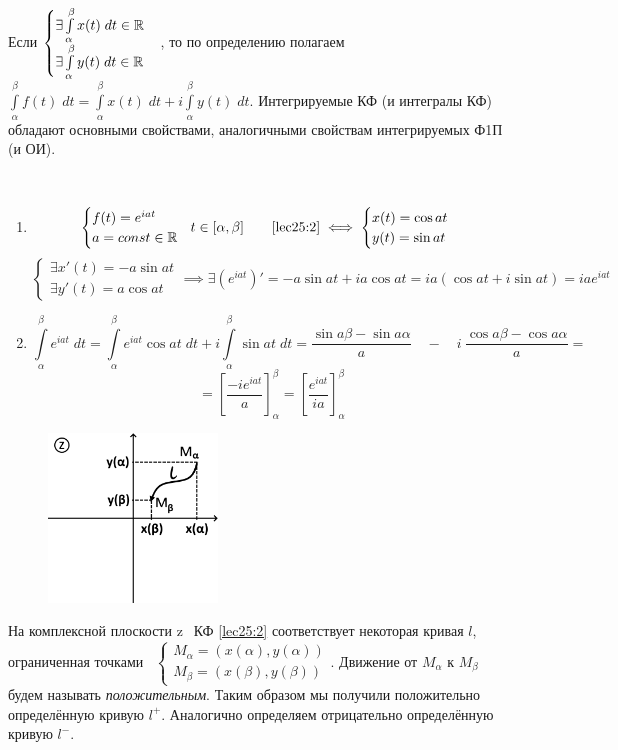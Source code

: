 \documentclass[../../main.tex]{subfiles}
\begin{document}
Если $\begin{cases}
	\exists \int\limits_{\alpha}^{\beta} x(t)\;dt  \in \mathbb{R} \\
	\exists \int\limits_{\alpha}^{\beta} y(t)\;dt  \in \mathbb{R}
\end{cases}$, то по определению полагаем
$\int\limits_{\alpha}^{\beta} f(t)\;dt = 
\int\limits_{\alpha}^{\beta} x(t)\;dt + i\int\limits_{\alpha}^{\beta} y(t)\;dt$.
Интегрируемые КФ (и интегралы КФ) обладают
основными свойствами, аналогичными 
свойствам интегрируемых Ф1П (и ОИ).
\begin{exmps}\  
\begin{enumerate}
\item\[\begin{cases}
	f(t) = e^{iat} \\
	a = const \in \mathbb{R}
\end{cases}\!\! t \in [\alpha, \beta]
\qquad
\eqref{lec25:2} \iff 
\begin{cases}
	x(t) = \cos{at} \\
	y(t) = \sin{at}
\end{cases}  
\]
\[\begin{cases}
	\exists x'(t) = -a\sin{at}  \\
	\exists y'(t) = a\cos{at}
\end{cases}\implies \exists \left(e^{iat} \right)' = -a\sin{at} + ia\cos{at} =
 ia(\cos{at} + i\sin{at}) = iae^{iat}
\]
\item\[
\int\limits_{\alpha}^{\beta}e^{iat}\;dt =
\int\limits_{\alpha}^{\beta}e^{iat}\cos{at}\;dt +
 i\int\limits_{\alpha}^{\beta}\sin{at}\;dt = 
 \frac{\sin{a\beta} - \sin{a\alpha}}{a}\quad  - \quad  
 i\ \frac{\cos{a\beta} - \cos{a\alpha}}{a} = \]\[
= \left[ \frac{-i{e}^{iat}}{a} \right]_{\alpha}^{\beta}= 
\left[ \frac{{e}^{iat}}{ia} \right]_{\alpha}^{\beta}
\]
\end{enumerate}
\end{exmps}

\begin{figure}
\includegraphics[width=0.4\textwidth]{lec25_1.png}
\end{figure}
На комплексной плоскости \textcircled{z}\  КФ \eqref{lec25:2} соответствует
некоторая кривая $l$, ограниченная точками \  $
\begin{cases}
	M_{\alpha} = (x(\alpha), y(\alpha)) \\
	M_{\beta} = (x(\beta), y(\beta))
\end{cases} $. Движение от $M_{\alpha}$ к $M_{\beta}$ будем называть 
\emph{положительным}. Таким образом мы получили положительно
определённую кривую $l^+$. Аналогично определяем отрицательно
определённую кривую $l^-$.
\end{document}
